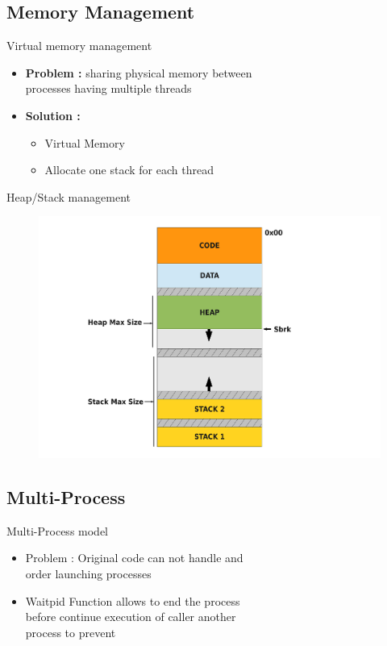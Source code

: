 \documentclass{beamer}
\begin{document}
\subsection{Memory Management}
\begin{frame}{Virtual memory management}
    \begin{itemize}
        \item \textbf{Problem :} sharing physical memory between 
            \\processes having multiple threads
        \item \textbf{Solution :}
            \begin{itemize}
                \item Virtual Memory 
                \item Allocate one stack for each thread
            \end{itemize}
    \end{itemize}
\end{frame}

\begin{frame}{Heap/Stack management}
    \begin{figure}[ht]
        \includegraphics[width=1\linewidth]{memoryschema.pdf}
    \end{figure}
\end{frame}

\subsection{Multi-Process}
\begin{frame}{Multi-Process model}
    \begin{itemize}
        \item Problem : Original code can not handle and
            \\order launching processes
        \item Waitpid Function allows to end the process 
            \\before continue execution of caller another
            \\process to prevent
    \end{itemize}
\end{frame}
\end{document}
